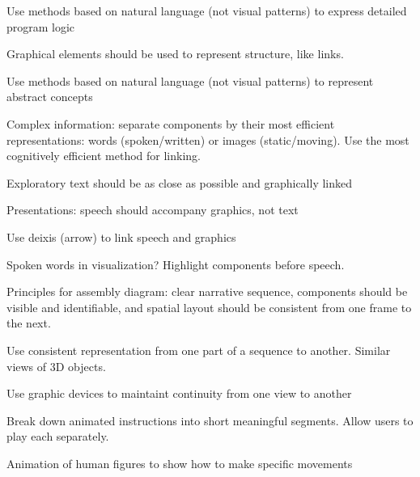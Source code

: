 \begin{compactenum}

\item Use methods based on natural language (not visual patterns) to express
    detailed program logic

\item Graphical elements should be used to represent structure, like links.

\item Use methods based on natural language (not visual patterns) to represent
    abstract concepts

\item Complex information: separate components by their most efficient
    representations: words (spoken/written) or images (static/moving). Use the
    most cognitively efficient method for linking.

\item Exploratory text should be as close as possible and graphically linked

\item Presentations: speech should accompany graphics, not text

\item Use deixis (arrow) to link speech and graphics

\item Spoken words in visualization? Highlight components before speech.

\item Principles for assembly diagram: clear narrative sequence, components
    should be visible and identifiable, and spatial layout should be consistent
    from one frame to the next.

\item Use consistent representation from one part of a sequence to another.
    Similar views of 3D objects.

\item Use graphic devices to maintaint continuity from one view to another

\item Break down animated instructions into short meaningful segments.
    Allow users to play each separately.

\item Animation of human figures to show how to make specific movements

\end{compactenum}




